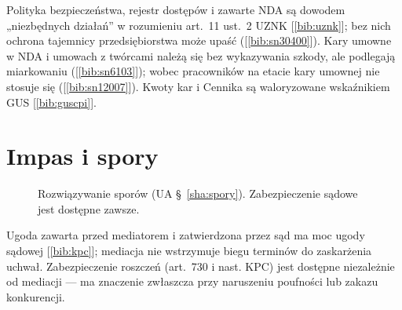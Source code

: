 \documentclass[11pt,a4paper]{report}
\newcommand{\Zr}[1]{[\ref{bib:#1}]}
\begin{document}
\begin{Komentarz}
Polityka bezpieczeństwa, rejestr dostępów i zawarte NDA są dowodem „niezbędnych działań” w rozumieniu art.~11 ust.~2 UZNK \Zr{uznk}; bez nich ochrona tajemnicy przedsiębiorstwa może upaść (\Zr{sn30400}). Kary umowne w NDA i umowach z twórcami należą się bez wykazywania szkody, ale podlegają miarkowaniu (\Zr{sn6103}); wobec pracowników na etacie kary umownej nie stosuje się (\Zr{sn12007}). Kwoty kar i Cennika są waloryzowane wskaźnikiem GUS \Zr{guscpi}.
\end{Komentarz}

\section{Impas i spory}

\begin{figure}[H]
\centering
{}
\caption{Rozwiązywanie sporów (UA §~\ref{sha:spory}). Zabezpieczenie sądowe jest dostępne zawsze.}
\end{figure}

\begin{Komentarz}
Ugoda zawarta przed mediatorem i zatwierdzona przez sąd ma moc ugody sądowej \Zr{kpc}; mediacja nie wstrzymuje biegu terminów do zaskarżenia uchwał. Zabezpieczenie roszczeń (art.~730 i nast. KPC) jest dostępne niezależnie od mediacji --- ma znaczenie zwłaszcza przy naruszeniu poufności lub zakazu konkurencji.
\end{Komentarz}
\end{document}
